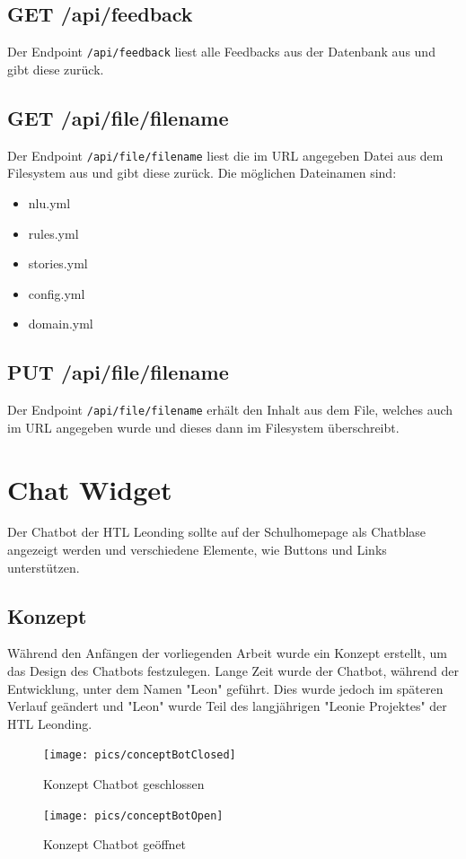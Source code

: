 \subsection{GET /api/feedback}
Der Endpoint \texttt{/api/feedback} liest alle Feedbacks aus der Datenbank aus und gibt diese zurück.

\subsection{GET /api/file/{filename}}
Der Endpoint \texttt{/api/file/{filename}} liest die im URL angegeben Datei aus dem Filesystem aus und gibt diese zurück.
Die möglichen Dateinamen sind:

\begin{itemize}
    \item nlu.yml
    \item rules.yml
    \item stories.yml
    \item config.yml
    \item domain.yml
\end{itemize}

\subsection{PUT /api/file/{filename}}
Der Endpoint \texttt{/api/file/{filename}} erhält den Inhalt aus dem File, welches auch im URL angegeben wurde und dieses dann im Filesystem überschreibt.

\section{Chat Widget}\label{sec:chat-widget}
Der Chatbot der HTL Leonding sollte auf der Schulhomepage als Chatblase angezeigt werden und verschiedene Elemente, wie Buttons und Links unterstützen.

\subsection{Konzept}
Während den Anfängen der vorliegenden Arbeit wurde ein Konzept erstellt, um das Design des Chatbots festzulegen.
Lange Zeit wurde der Chatbot, während der Entwicklung, unter dem Namen "Leon" geführt.
Dies wurde jedoch im späteren Verlauf geändert und "Leon" wurde Teil des langjährigen "Leonie Projektes" der HTL Leonding.

\begin{figure}[hbt!]
    \centering
    \texttt{[image: pics/conceptBotClosed]}
    \caption{Konzept Chatbot geschlossen}
    \label{fig:impl:conceptBotClosed}
\end{figure}
\begin{figure}[hbt!]
    \centering
    \texttt{[image: pics/conceptBotOpen]}
    \caption{Konzept Chatbot geöffnet}
    \label{fig:impl:conceptBotOpen}
\end{figure}


